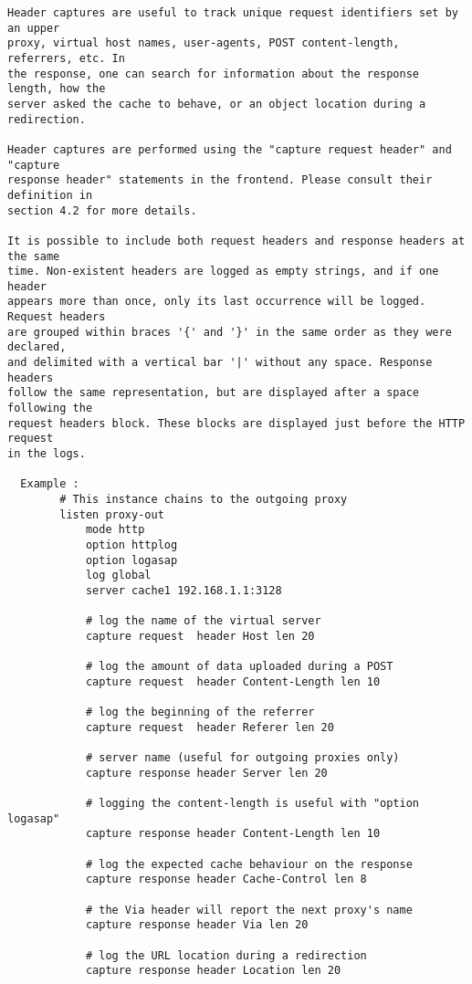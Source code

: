 \begin{verbatim}
Header captures are useful to track unique request identifiers set by an upper
proxy, virtual host names, user-agents, POST content-length, referrers, etc. In
the response, one can search for information about the response length, how the
server asked the cache to behave, or an object location during a redirection.

Header captures are performed using the "capture request header" and "capture
response header" statements in the frontend. Please consult their definition in
section 4.2 for more details.

It is possible to include both request headers and response headers at the same
time. Non-existent headers are logged as empty strings, and if one header
appears more than once, only its last occurrence will be logged. Request headers
are grouped within braces '{' and '}' in the same order as they were declared,
and delimited with a vertical bar '|' without any space. Response headers
follow the same representation, but are displayed after a space following the
request headers block. These blocks are displayed just before the HTTP request
in the logs.

  Example :
        # This instance chains to the outgoing proxy
        listen proxy-out
            mode http
            option httplog
            option logasap
            log global
            server cache1 192.168.1.1:3128

            # log the name of the virtual server
            capture request  header Host len 20

            # log the amount of data uploaded during a POST
            capture request  header Content-Length len 10

            # log the beginning of the referrer
            capture request  header Referer len 20

            # server name (useful for outgoing proxies only)
            capture response header Server len 20

            # logging the content-length is useful with "option logasap"
            capture response header Content-Length len 10

            # log the expected cache behaviour on the response
            capture response header Cache-Control len 8

            # the Via header will report the next proxy's name
            capture response header Via len 20

            # log the URL location during a redirection
            capture response header Location len 20


\end{verbatim}
